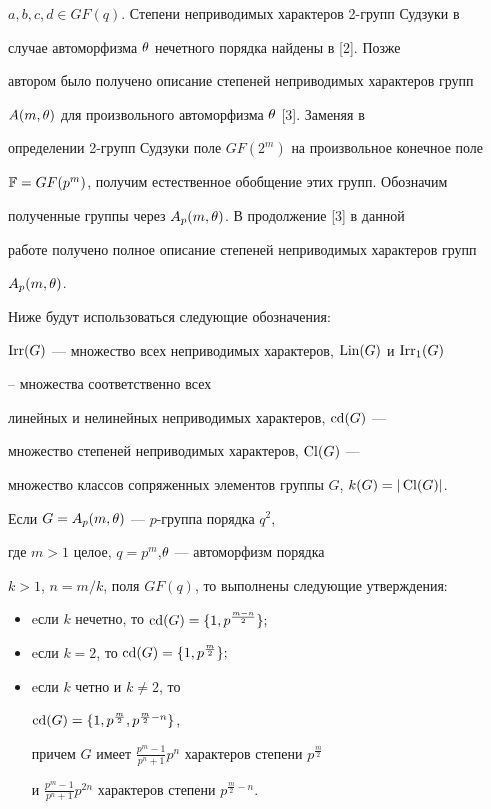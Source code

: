 $a,b,c,d\in GF(q)$. Степени неприводимых характеров 2-групп Судзуки в


случае автоморфизма $\theta$ нечетного порядка найдены в [2]. Позже


автором было получено описание степеней неприводимых характеров групп 


$A(m,\theta)$ для произвольного автоморфизма $\theta$ [3]. Заменяя в 


определении 2-групп Судзуки поле $GF(2^m)$ на произвольное конечное поле 


$\Bbb F=GF(p^m)$, получим естественное обобщение этих групп. Обозначим 


полученные группы через $A_p(m,\theta)$. В продолжение [3] в данной 


работе получено полное описание степеней неприводимых характеров групп 


$A_p(m,\theta)$.





Ниже будут использоваться следующие обозначения:


$\operatorname{Irr}(G)$ --- множество всех неприводимых характеров, $\operatorname{Lin}(G)$ и $\operatorname{Irr_1}(G)$ 


-- множества соответственно всех 


линейных и нелинейных неприводимых характеров, $\operatorname{cd}(G)$ ---


множество степеней неприводимых характеров, $\operatorname{Cl}(G)$ ---


множество классов сопряженных элементов группы $G$, $k(G)=|\operatorname{Cl}(G)|$.








\begin{maint}


Если $G=A_p(m,\theta)$ --- $p$-группа порядка $q^2$,


где $m>1$ целое, $q=p^m$,\linebreak $\theta$ --- автоморфизм порядка


$k>1$, $n=m/k$, поля $GF(q)$, то выполнены следующие утверждения\/${:}$


\begin{itemize}


\item[(i)] eсли $k$ нечетно, то $\operatorname{cd}(G)=\lbrace1,p^{\frac{m-n}2}\rbrace;$


\item[(ii)] eсли $k=2$, то $\operatorname{cd}(G)=\lbrace1,p^{\frac m2}\rbrace;$


\item[(iii)] eсли $k$ четно и $k\neq2$, то


$\operatorname{cd}(G)=\lbrace1,p^{\frac m2},p^{\frac m2-n}\rbrace$,


причем $G$ имеет $\frac{p^m-1}{p^n+1}p^n$ характеров степени $p^{\frac m2}$


и $\frac{p^m-1}{p^n+1}p^{2n}$ характеров степени $p^{\frac m2-n}$.


\end{itemize}


\end{maint}





